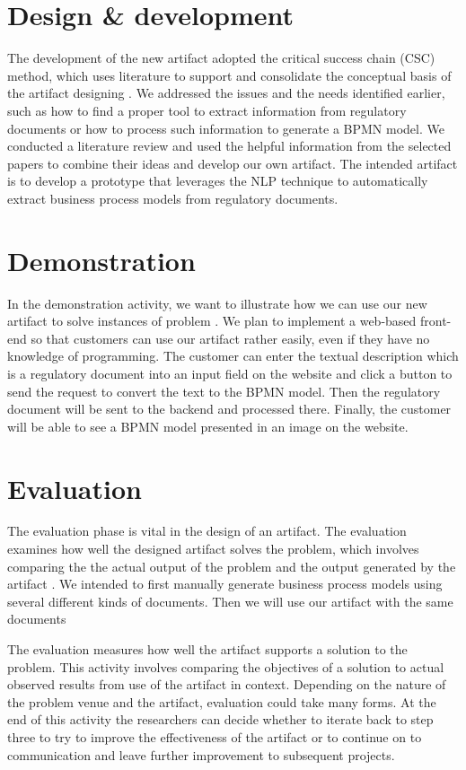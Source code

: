 \section{Design \& development}
The development of the new artifact adopted the critical success chain (CSC) method, which uses literature to support and consolidate the conceptual basis of the artifact designing \cite{DSM_2}. We addressed the issues and the needs identified earlier, such as how to find a proper tool to extract information from regulatory documents or how to process such information to generate a BPMN model. We conducted a literature review and used the helpful information from the selected papers to combine their ideas and develop our own artifact. The intended artifact is to develop a prototype that leverages the NLP technique to automatically extract business process models from regulatory documents.

\section{Demonstration}
In the demonstration activity, we want to illustrate how we can use our new artifact to solve instances of problem \cite{DSM_3}. We plan to implement a web-based front-end so that customers can use our artifact rather easily, even if they have no knowledge of programming. The customer can enter the textual description which is a regulatory document into an input field on the website and click a button to send the request to convert the text to the BPMN model. Then the regulatory document will be sent to the backend and processed there. Finally, the customer will be able to see a BPMN model presented in an image on the website.

\section{Evaluation}
The evaluation phase is vital in the design of an artifact. The evaluation examines how well the designed artifact solves the problem, which involves comparing the the actual output of the problem and the output generated by the artifact \cite{DSM_3}. We intended to first manually generate business process models using several different kinds of documents. Then we will use our artifact with the same documents  




The evaluation measures how well the artifact supports a solution to the problem. This activity involves comparing the objectives of a solution to actual observed results from use of the artifact in context. Depending on the nature of the problem venue and the artifact, evaluation could take many forms. At the end of this activity the researchers can decide whether to iterate back to step three to try to improve the effectiveness of the artifact or to continue on to communication and leave further improvement to subsequent projects.




